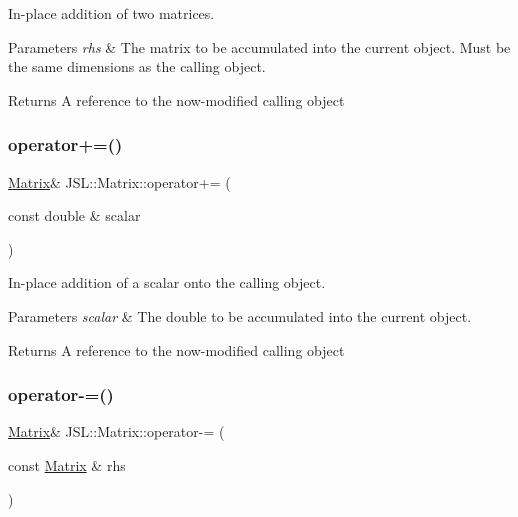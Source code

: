 In-\/place addition of two matrices. 


\begin{DoxyParams}{Parameters}
{\em rhs} & The matrix to be accumulated into the current object. Must be the same dimensions as the calling object. \\
\hline
\end{DoxyParams}
\begin{DoxyReturn}{Returns}
A reference to the now-\/modified calling object 
\end{DoxyReturn}
\mbox{\label{classJSL_1_1Matrix_ae2dfa2fcbc80ee24c02125e5739bc0c1}} 
\subsubsection{\texorpdfstring{operator+=()}{operator+=()}\hspace{0.1cm}{\footnotesize\ttfamily [2/2]}}
{\footnotesize\ttfamily \hyperlink{classJSL_1_1Matrix}{Matrix}\& J\+S\+L\+::\+Matrix\+::operator+= (\begin{DoxyParamCaption}\item[{const double \&}]{scalar }\end{DoxyParamCaption})\hspace{0.3cm}{\ttfamily [inline]}}



In-\/place addition of a scalar onto the calling object. 


\begin{DoxyParams}{Parameters}
{\em scalar} & The double to be accumulated into the current object. \\
\hline
\end{DoxyParams}
\begin{DoxyReturn}{Returns}
A reference to the now-\/modified calling object 
\end{DoxyReturn}
\mbox{\label{classJSL_1_1Matrix_abec89912c20210f6b49c5d09e1c1845b}} 
\subsubsection{\texorpdfstring{operator-\/=()}{operator-=()}\hspace{0.1cm}{\footnotesize\ttfamily [1/2]}}
{\footnotesize\ttfamily \hyperlink{classJSL_1_1Matrix}{Matrix}\& J\+S\+L\+::\+Matrix\+::operator-\/= (\begin{DoxyParamCaption}\item[{const \hyperlink{classJSL_1_1Matrix}{Matrix} \&}]{rhs }\end{DoxyParamCaption})\hspace{0.3cm}{\ttfamily [inline]}}



